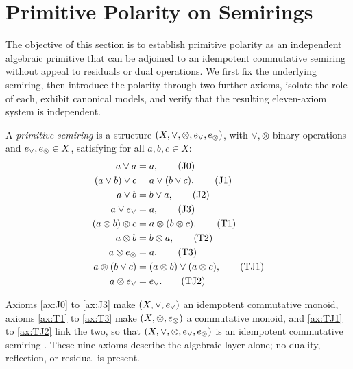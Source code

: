 
\section{Primitive Polarity on Semirings}\label{sec:ps}

The objective of this section is to establish primitive polarity as an
independent algebraic primitive that can be adjoined to an idempotent
commutative semiring without appeal to residuals or dual operations. We
first fix the underlying semiring, then introduce the polarity through two
further axioms, isolate the role of each, exhibit canonical models, and
verify that the resulting eleven-axiom system is independent.

\begin{definition}\label{def:semiring}
A \emph{primitive semiring} is a structure $(X,\vee,\otimes,e_{\vee},e_{\otimes})$, with
$\vee,\otimes$ binary operations and $e_{\vee},e_{\otimes} \in X$, satisfying for all
$a,b,c \in X$:
\begin{align}
  a \vee a &= a, \tag{J0}\label{ax:J0}\\
  (a \vee b) \vee c &= a \vee (b \vee c), \tag{J1}\label{ax:J1}\\
  a \vee b &= b \vee a, \tag{J2}\label{ax:J2}\\
  a \vee e_{\vee} &= a, \tag{J3}\label{ax:J3}\\
  (a \otimes b) \otimes c &= a \otimes (b \otimes c), \tag{T1}\label{ax:T1}\\
  a \otimes b &= b \otimes a, \tag{T2}\label{ax:T2}\\
  a \otimes e_{\otimes} &= a, \tag{T3}\label{ax:T3}\\
  a \otimes (b \vee c) &= (a \otimes b) \vee (a \otimes c),
    \tag{TJ1}\label{ax:TJ1}\\
  a \otimes e_{\vee} &= e_{\vee}. \tag{TJ2}\label{ax:TJ2}
\end{align}
\end{definition}

Axioms \eqref{ax:J0} to \eqref{ax:J3} make $(X,\vee,e_{\vee})$ an idempotent
commutative monoid, axioms \eqref{ax:T1} to \eqref{ax:T3} make
$(X,\otimes,e_{\otimes})$ a commutative monoid, and \eqref{ax:TJ1} to \eqref{ax:TJ2}
link the two, so that $(X,\vee,\otimes,e_{\vee},e_{\otimes})$ is an idempotent commutative
semiring \citep{Golan1999}. These nine axioms describe the algebraic layer
alone; no duality, reflection, or residual is present.


